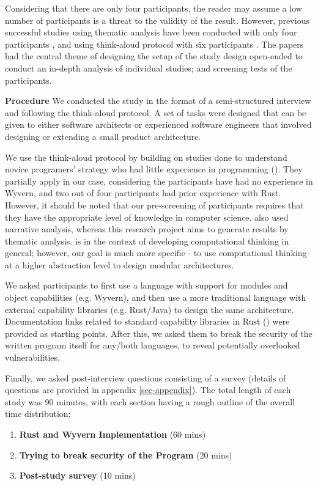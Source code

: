 Considering that there are only four participants, the reader may assume a low number of participants is a threat to the validity of the result. However, previous successful studies using thematic analysis have been conducted with only four participants \cite{Huang2023}, and using think-aloud protocol with six participants \cite{whalley2014qualitative}. The papers had the central theme of designing the setup of the study design open-ended to conduct an in-depth analysis of individual studies; and screening tests of the participants. 

\noindent
\textbf{Procedure}  We conducted the study in the format of a semi-structured interview and following the think-aloud protocol. A set of tasks were designed that can be given to either software architects or experienced software engineers that involved designing or extending a small product architecture. 

We use the think-aloud protocol by building on studies done to understand novice programers' strategy who had little experience in programming (\cite{whalley2014qualitative, lye2014review}). They partially apply in our case, considering the participants have had no experience in Wyvern, and two out of four participants had prior experience with Rust. However, it should be noted that our pre-screening of participants requires that they have the appropriate level of knowledge in computer science. \cite{whalley2014qualitative} also used narrative analysis, whereas this research project aims to generate results by thematic analysis. \cite{lye2014review} is in the context of developing computational thinking in general; however, our goal is much more specific - to use computational thinking at a higher abstraction level to design modular architectures.

We asked participants to first use a language with support for modules and object capabilities (e.g. Wyvern), and then use a more traditional language with external capability libraries (e.g. Rust/Java) to design the same architecture. Documentation links related to standard capability libraries in Rust (\cite{libcaprust, libcapdirrust, librust}) were provided as starting points. After this, we asked them to break the security of the written program itself for any/both languages, to reveal potentially overlooked vulnerabilities. 

Finally, we asked post-interview questions consisting of a survey (details of questions are provided in appendix \ref{sec-appendix}). The total length of each study was 90 minutes, with each section having a rough outline of the overall time distribution:
\begin{enumerate}
    \item \textbf{Rust and Wyvern Implementation} (60 mins)
    \item \textbf{Trying to break security of the Program} (20 mins)
    \item \textbf{Post-study survey} (10 mins)
\end{enumerate}

